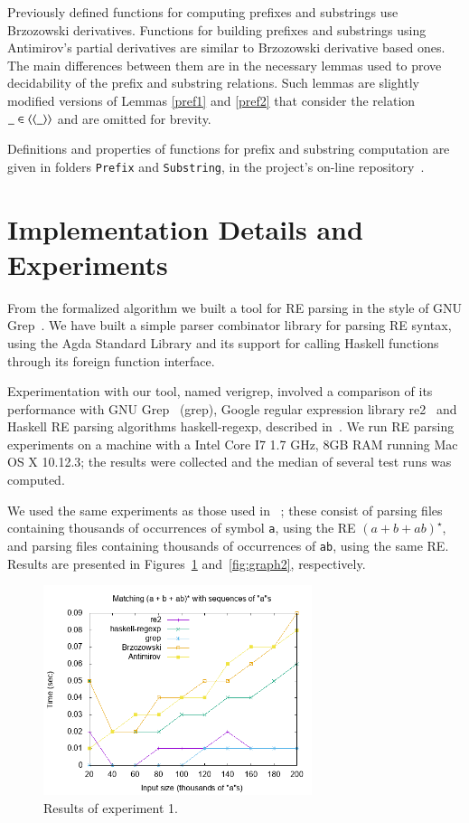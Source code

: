 \documentclass[review]{elsarticle}
\theoremstyle{definition}
\newcommand{\D}[1]{\blue{\mathsf{#1}}}
\begin{document}
Previously defined functions for computing prefixes and substrings use Brzozowski
derivatives. Functions for building prefixes and substrings using Antimirov's
partial derivatives are similar to Brzozowski derivative based ones.
The main differences between them are in the necessary lemmas used to prove
decidability of the prefix and substring relations. Such lemmas are slightly modified
versions of Lemmas \ref{pref1} and \ref{pref2} that consider the relation
\ensuremath{\D{\_\in\langle\langle\_\rangle\rangle}}  and are omitted for brevity.

Definitions and properties of functions for prefix and substring computation
are given in folders \texttt{Prefix} and \texttt{Substring}, in the project's on-line
repository~\cite{regex-rep}.

\section{Implementation Details and Experiments}\label{sec:exp}

From the formalized algorithm we built a tool for RE parsing in the
style of GNU Grep~\cite{Grep}. We have built a simple parser
combinator library for parsing RE syntax, using the Agda Standard
Library and its support for calling Haskell functions through its
foreign function interface.

Experimentation with our tool, named verigrep, involved a comparison
of its performance with GNU Grep~\cite{Grep} (grep), Google regular
expression library re2~\cite{re2} and Haskell RE parsing algorithms
haskell-regexp, described in~\cite{Fischer2010}. We run RE parsing
experiments on a machine with a Intel Core I7 1.7 GHz, 8GB RAM running
Mac OS X 10.12.3; the results were collected and the median of several
test runs was computed.

We used the same experiments as those used in ~\cite{SulzmannL14};
these consist of parsing files containing thousands of occurrences of
symbol \texttt{a}, using the RE $(a + b + ab)^\star$, and parsing
files containing thousands of occurrences of \texttt{ab}, using the
same RE. Results are presented in Figures~\ref{fig:graph1}
and~\ref{fig:graph2}, respectively.

\begin{figure}[!ht]
    \includegraphics[width=0.7\textwidth]{as.png}
   \centering
   \caption{Results of experiment 1.}
   \label{fig:graph1}
\end{figure}
\end{document}
